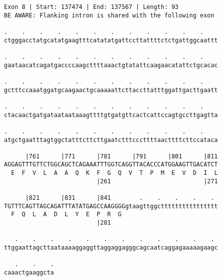 \documentclass{article}
\begin{document}
\begin{Verbatim}[fontfamily=courier]
Exon 8 | Start: 137474 | End: 137567 | Length: 93
BE AWARE: Flanking intron is shared with the following exon

.    .    .    .    .    .    .    .    .    .    .    .    
ctgggacctatgcatatgaagtttcatatatgattccttattttctctgattggcaattt

.    .    .    .    .    .    .    .    .    .    .    .    
gaataacatcagatgaccccaagcttttaaactgtatattcaagaacatattctgcacac

.    .    .    .    .    .    .    .    .    .    .    .    
gctttccaaatggatgcaagaactgcaaaaattcttaccttatttggattgacttgaatt

.    .    .    .    .    .    .    .    .    .    .    .    
ctacaactgatgataataataaagttttgtgatgttcactcattccagtgccttgagtta

.    .    .    .    .    .    .    .    .    .    .    .    
atgctgaatttagtggctatttcttcttgaatctttcccttttaacttttcttccataca

      |761      |771      |781      |791      |801      |811
AGGAGTTTGTTCTGGCAGCTCAGAAATTTGGTCAGGTTACACCCATGGAAGTTGACATCT
  E  F  V  L  A  A  Q  K  F  G  Q  V  T  P  M  E  V  D  I  L
                          |261                          |271

      |821      |831      |841        .    .    .    .    . 
TGTTTCAGTTAGCAGATTTATATGAGCCAAGGGGgtaagttggctttttttttttttttt
  F  Q  L  A  D  L  Y  E  P  R  G                           
                          |281                              

   .    .    .    .    .    .    .    .    .    .    .    . 
ttggaattagcttaataaaaggaggttaggaggagggcagcaatcaggagaaaaagaagc

   .    .    .
caaactgaaggcta
\end{Verbatim}
\newpage
\end{document}
